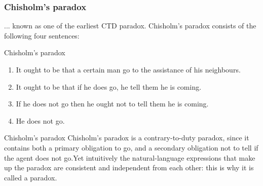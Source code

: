 \documentclass{beamer}
\begin{document}
\begin{frame}
\frametitle{Chisholm's paradox}

... known as one of the earliest CTD paradox.
Chisholm's paradox consists of the following four sentences:

\begin{block}{Chisholm's paradox}
\begin{enumerate}
\item  It ought to be that a certain man go to the assistance of his neighbours.
\item  It ought to be that if he does go, he tell them he is coming.
\item If he does not go then he ought not to tell them he is coming.
\item He does not go.
\end{enumerate}
\end{block}

\end{frame}
\begin{frame}{Chisholm’s paradox}
Chisholm’s paradox is a contrary-to-duty paradox, since it contains both a primary obligation to go, and a secondary obligation not to tell if the agent does not go.Yet intuitively the natural-language expressions
that make up the paradox are consistent and independent from each other: this is
why it is called a paradox.
    
\end{frame}

\end{document}
